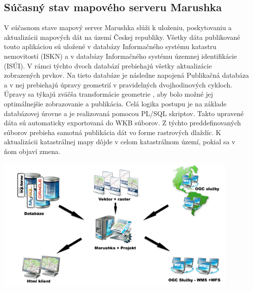 \documentclass[12pt]{article}
\begin{document}
\subsection{Súčasný stav mapového serveru Marushka}

V súčasnom stave mapový server Marushka slúži k uloženiu, poskytovaniu a aktualizácii mapových dát na území Českej republiky. Všetky dáta publikované touto aplikáciou sú uložené v databázy Informačného systému katastru nemovitostí (ISKN) a v databázy Informačného systému územnej identifikácie (ISÚI). V rámci týchto dvoch databází prebiehajú všetky aktualizácie zobrazených prvkov. Na tieto databáze je následne napojená Publikačná databáza a v nej prebiehajú úpravy geometrií v pravidelných dvojhodinových cykloch. Úpravy sa týkajú zväčša transformácie geometrie , aby bolo možné jej optimálnejšie zobrazovanie a publikácia. Celá logika postupu je na základe databázovej úrovne a je realizovaná pomocou PL/SQL skriptov. Takto upravené dáta sú automaticky exportovaná do WKB súborov. Z týchto preddefinovaných súborov prebieha samotná publikácia dát vo forme rastrových dlaždíc. K aktualizácii katastrálnej mapy dôjde v celom katastrálnom území, pokial sa v ňom objaví zmena.

\begin{center}
   \includegraphics[width=12cm]{./img/Marushka1.png}
\end{center}
\end{document}
